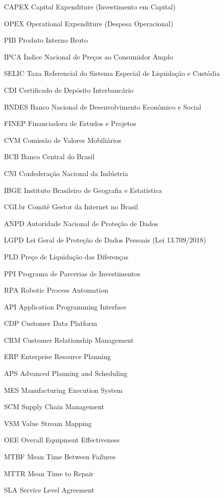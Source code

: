 \begin{siglas}
\item[CAPEX] Capital Expenditure (Investimento em Capital)
\item[OPEX] Operational Expenditure (Despesa Operacional)
\item[PIB] Produto Interno Bruto
\item[IPCA] Índice Nacional de Preços ao Consumidor Amplo
\item[SELIC] Taxa Referencial do Sistema Especial de Liquidação e Custódia
\item[CDI] Certificado de Depósito Interbancário
\item[BNDES] Banco Nacional de Desenvolvimento Econômico e Social
\item[FINEP] Financiadora de Estudos e Projetos
\item[CVM] Comissão de Valores Mobiliários
\item[BCB] Banco Central do Brasil
\item[CNI] Confederação Nacional da Indústria
\item[IBGE] Instituto Brasileiro de Geografia e Estatística
\item[CGI.br] Comitê Gestor da Internet no Brasil
\item[ANPD] Autoridade Nacional de Proteção de Dados
\item[LGPD] Lei Geral de Proteção de Dados Pessoais (Lei 13.709/2018)
\item[PLD] Preço de Liquidação das Diferenças
\item[PPI] Programa de Parcerias de Investimentos
\item[RPA] Robotic Process Automation
\item[API] Application Programming Interface
\item[CDP] Customer Data Platform
\item[CRM] Customer Relationship Management
\item[ERP] Enterprise Resource Planning
\item[APS] Advanced Planning and Scheduling
\item[MES] Manufacturing Execution System
\item[SCM] Supply Chain Management
\item[VSM] Value Stream Mapping
\item[OEE] Overall Equipment Effectiveness
\item[MTBF] Mean Time Between Failures
\item[MTTR] Mean Time to Repair
\item[SLA] Service Level Agreement

\end{siglas}
